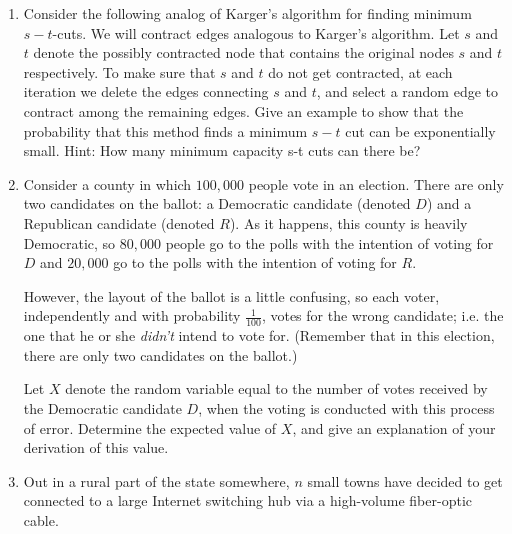 \documentclass[12pt]{article}
\begin{document}
\begin{enumerate}

\item 

Consider the following analog of Karger's algorithm for finding 
minimum $s-t$-cuts. We will contract edges analogous to Karger's 
algorithm. Let $s$ and $t$ denote the possibly contracted 
node that contains the original nodes $s$ and $t$ 
respectively. To make sure that $s$ and $t$ do 
not get contracted, at each iteration we delete the 
edges connecting $s$ and $t$, and select a random 
edge to contract among the remaining edges. Give an 
example to show that the probability that this method 
finds a minimum $s-t$ cut can be exponentially small. 
Hint: How many minimum capacity s-t cuts can there 
be?         


\item 

Consider a county in which $100,000$ people
vote in an election.
There are only two candidates on the ballot:
a Democratic candidate (denoted $D$) and
a Republican candidate (denoted $R$).
As it happens, this county is heavily Democratic,
so $80,000$ people go to the polls with the intention
of voting for $D$ and $20,000$
go to the polls with the intention of voting for $R$.

However, the layout of the ballot is a little confusing,
so each voter, independently and with probability $\frac{1}{100}$,
votes for the wrong candidate; i.e. the one that he or she
{\em didn't} intend to vote for.
(Remember that in this election, there are only
two candidates on the ballot.)

Let $X$ denote the random variable equal to the
number of votes received by the Democratic candidate $D$,
when the voting is conducted with this process of error.
Determine the expected value of $X$, and give
an explanation of your derivation of this value.



\item


Out in a rural part of the state somewhere,
$n$ small towns have decided to get connected
to a large Internet switching hub via
a high-volume fiber-optic cable.

\begin{figure}[h]
\begin{center}


\end{center}
\end{figure}
\end{enumerate}
\end{document}
